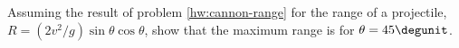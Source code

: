  Assuming the result of problem \ref{hw:cannon-range} for the
range of a projectile, $R=(2v^2/g)\sin\theta\cos\theta$, show that the maximum range is
for $\theta =45\degunit$.
